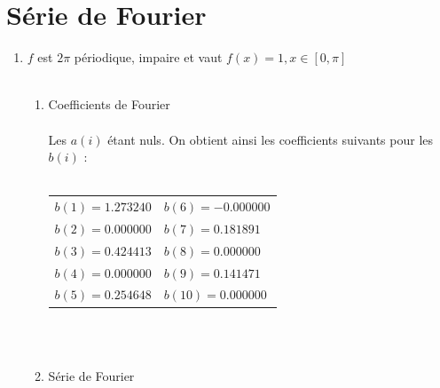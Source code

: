 \documentclass[a4paper,12pt]{report}
\begin{document}
\chapter{Série de Fourier}
	\begin{enumerate}
		\item $f$ est $2\pi$ périodique, impaire et vaut $f(x)=1, x \in [0,\pi]$ \\ \\
		\begin{enumerate}
			\item Coefficients de Fourier \\ \\
			Les $a(i)$ étant nuls. On obtient ainsi les coefficients suivants pour les $b(i)$ : \\ \\
			\begin{centering}
				\begin{tabular}{l l}
					$b(1) = 1.273240$ & \hspace*{2cm}$b(6) = -0.000000$\\
					$b(2) = 0.000000$ & \hspace*{2cm}$b(7) = 0.181891$\\
					$b(3) = 0.424413$ & \hspace*{2cm}$b(8) = 0.000000$\\
					$b(4) = 0.000000$ & \hspace*{2cm}$b(9) = 0.141471$\\
					$b(5) = 0.254648$ & \hspace*{2cm}$b(10) = 0.000000$\\
				\end{tabular}
			\end{centering}\\ \\
			\item Série de Fourier \\ \\ \\ \\ \\ \\ \\ \\ \\ \\ \\ \\ \\ \\ \\ \\ \\ \\ \\


\end{enumerate}
\end{enumerate}
\end{document}
